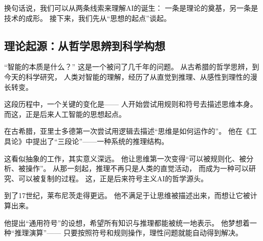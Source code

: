 换句话说，我们可以从两条线索来理解AI的诞生：
一条是理论的奠基，另一条是技术的成形。
接下来，我们先从“思想的起点”谈起。

\subsection{理论起源：从哲学思辨到科学构想}


“智能的本质是什么？”
这是一个被问了几千年的问题。
从古希腊的哲学思辨，到今天的科学研究，
人类对智能的理解，经历了从直觉到推理、从感性到理性的漫长转变。

这段历程中，一个关键的变化是——
人开始尝试用规则和符号去描述思维本身。
而这，正是后来人工智能的思想起点。



在古希腊，亚里士多德第一次尝试用逻辑去描述“思维是如何运作的”。
他在《工具论》中提出了“三段论”——一种系统的推理结构。

这看似抽象的工作，其实意义深远。
他让思维第一次变得“可以被规则化、被分析、被操作”。
从那一刻起，推理不再只是人类的直觉活动，
而成为一种可以研究、可以被复制的过程。
这，正是后来符号主义AI的哲学源头。



到了17世纪，莱布尼茨走得更远。
他不满足于让思维被描述出来，而想让它被计算出来。

他提出“通用符号”的设想，希望所有知识与推理都能被统一地表示。
他梦想着一种“推理演算”——
只要按照符号和规则操作，理性问题就能自动得到解决。

